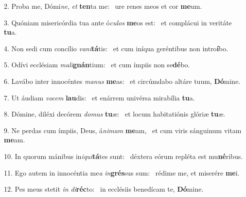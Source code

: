2. Proba me, Dómi\textit{ne}, \textit{et} \textbf{ten}ta me: \ast\  ure renes meos et cor \textbf{me}um.\

3. Quóniam misericórdia tua ante ó\textit{cu}\textit{los} \textbf{me}os est: \ast\  et complácui in veritáte \textbf{tu}a.\

4. Non sedi cum concílio \textit{va}\textit{ni}\textbf{tá}tis: \ast\  et cum iníqua geréntibus non intro\textbf{í}bo.\

5. Odívi ecclésiam \textit{ma}\textit{li}\textbf{gnán}tium: \ast\  et cum ímpiis non se\textbf{dé}bo.\

6. Lavábo inter innocéntes \textit{ma}\textit{nus} \textbf{me}as: \ast\  et circúmdabo altáre tuum, \textbf{Dó}mine.\

7. Ut áudiam \textit{vo}\textit{cem} \textbf{lau}dis: \ast\  et enárrem univérsa mirabília \textbf{tu}a.\

8. Dómine, diléxi decórem \textit{do}\textit{mus} \textbf{tu}æ: \ast\  et locum habitatiónis glóriæ \textbf{tu}æ.\

9. Ne perdas cum ímpiis, Deus, á\textit{ni}\textit{mam} \textbf{me}am, \ast\  et cum viris sánguinum vitam \textbf{me}am.\

10. In quorum mánibus in\textit{i}\textit{qui}\textbf{tá}tes sunt: \ast\  déxtera eórum repléta est mu\textbf{né}ribus.\

11. Ego autem in innocéntia me\textit{a} \textit{in}\textbf{grés}sus sum: \ast\  rédime me, et miserére \textbf{me}i.\

12. Pes meus stetit \textit{in} \textit{di}\textbf{réc}to: \ast\  in ecclésiis benedícam te, \textbf{Dó}mine.\


